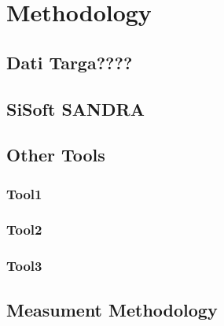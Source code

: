 

\chapter{Methodology} \label{chap3:methodology}

\section{Dati Targa????} \label{sec3:}

\section{SiSoft SANDRA} \label{sec3:sandra}

\section{Other Tools} \label{sec3:other_tools}

\subsection{Tool1} \label{}
\subsection{Tool2} \label{}
\subsection{Tool3} \label{}

\section{Measument Methodology} \label{sec3:measurement_methodology}

